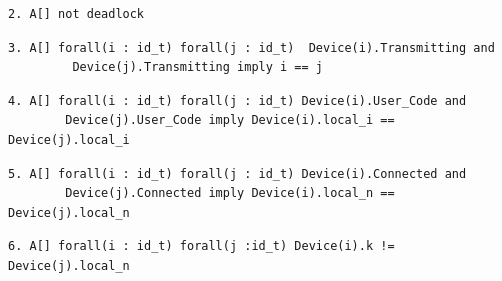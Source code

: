 \begin{lstlisting}[language={[GUI]Uppaal}, % use GUI flavor
columns={[l]flexible},
frameround=fftt, frame=shadowbox, rulesepcolor=\color{gray}, title={The query asks if there is no deadlock in the system.}]
2. A[] not deadlock
\end{lstlisting}

\begin{lstlisting}[language={[GUI]Uppaal}, % use GUI flavor
columns={[l]flexible},
frameround=fftt, frame=shadowbox, rulesepcolor=\color{gray}, title={This asks if a device i, and a device j are both transmitting, does it then mean they are the same.}]
3. A[] forall(i : id_t) forall(j : id_t)  Device(i).Transmitting and
		 Device(j).Transmitting imply i == j
\end{lstlisting}
\begin{lstlisting}[language={[GUI]Uppaal}, % use GUI flavor
columns={[l]flexible},
frameround=fftt, frame=shadowbox, rulesepcolor=\color{gray}, title={This query asks if two devices are both in the location \texttt{User\_Code} do they then have the same value of their \texttt{local\_i}}]
4. A[] forall(i : id_t) forall(j : id_t) Device(i).User_Code and 
		Device(j).User_Code imply Device(i).local_i == Device(j).local_i
\end{lstlisting}
\begin{lstlisting}[language={[GUI]Uppaal}, % use GUI flavor
columns={[l]flexible},
frameround=fftt, frame=shadowbox, rulesepcolor=\color{gray}, title={This query asks if a device i and a device j is both connected, do they then have the same value of their \texttt{local\_n}. If they were different it would mean that they are not in the same network, and as such would have different numbers of time-slots in their networks. But the system model makes sure that this is not the case.}]
5. A[] forall(i : id_t) forall(j : id_t) Device(i).Connected and 
		Device(j).Connected imply Device(i).local_n == Device(j).local_n
\end{lstlisting}

\begin{lstlisting}[language={[GUI]Uppaal}, % use GUI flavor
columns={[l]flexible},
frameround=fftt, frame=shadowbox, rulesepcolor=\color{gray}, title={This query asks if it always true that all devices never has the the time-slot which one of the devices has locally as the empty-slot. If any device did have this, it would mean that a device was out of sync, since it did not know which time-slot would be the empty one. }]
6. A[] forall(i : id_t) forall(j :id_t) Device(i).k != Device(j).local_n
\end{lstlisting}

